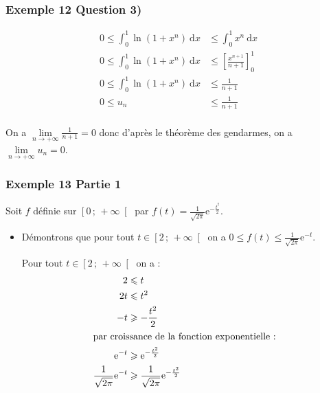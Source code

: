 \documentclass[11pt, hyperref={urlcolor=red,%
            linkcolor=blue, %
            colorlinks=true}]{beamer}
\newcommand{\Interfo}[2]{\left[#1\, ;\, #2\right[}
\newcommand{\limitesuite}[1]{\lim\limits
_{n \to +\infty} #1}
\newcommand{\dx}{\ensuremath{\text{d}x}}		%
\newcommand{\integralex}[3]{\int_{#1}^{#2} #3 \ \dx}
\begin{document}
\begin{frame}
\frametitle{Exemple  12 Question 3)}
\pause \begin{align*}
0 \leqslant \integralex{0}{1}{\ln(1+x^{n}) } & \leqslant \integralex{0}{1}{x^{n}} \\
0 \leqslant \integralex{0}{1}{\ln(1+x^{n}) } & \leqslant \left[\frac{x^{n+1}}{n+1} \right]_{0}^{1} \\
0 \leqslant \integralex{0}{1}{\ln(1+x^{n}) } & \leqslant \frac{1}{n+1}\\
0 \leqslant u_{n} & \leqslant \frac{1}{n+1}\\
\end{align*}

On a $\limitesuite{\frac{1}{n+1}}=0$ donc d'après le théorème des gendarmes, on a $\limitesuite{u_{n}}=0$.




\end{frame}





\begin{frame}
\frametitle{Exemple  13 Partie 1}

Soit $f$ définie sur $\Interfo{0}{+\infty}$ par $f(t)=\frac{1}{\sqrt{2\pi}}\text{e}^{-\frac{t^2}{2}}$.
\begin{itemize}
\item Démontrons que pour tout $t \in \Interfo{2}{+\infty}$ on a  
 $0 \leqslant f(t) \leqslant \frac{1}{\sqrt{2\pi}}\text{e}^{-t}$.


Pour tout  $t \in \Interfo{2}{+\infty}$ on a :
\pause \begin{align*}
2 &\leqslant t \\
2t & \leqslant t^{2} \\
-t & \geqslant -\frac{t^2}{2} \\
\intertext{par croissance de la fonction exponentielle : }
\text{e}^{-t}  &\geqslant \text{e}^{-\frac{t^2}{2}} \\
\frac{1}{\sqrt{2\pi}}\text{e}^{-t}  &\geqslant \frac{1}{\sqrt{2\pi}}\text{e}^{-\frac{t^2}{2}}
\end{align*}


\end{itemize}

\end{frame}
\end{document}
